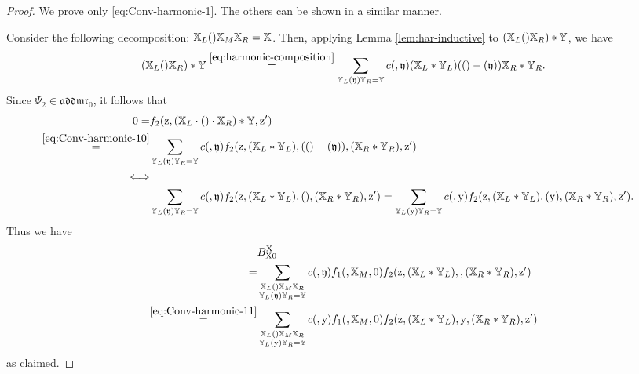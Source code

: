 \documentclass[15pt,oneside,reqno]{amsart}
\theoremstyle{remark}{
\newtheorem{lem}[df]{Lemma}
\newtheorem{prop}[df]{Proposition}
\newtheorem{ex}[df]{Example}
\newtheorem{rmk}[df]{Remark}
}
\newcommand{\ide}[1]{\mathfrak{#1}}
\newcommand{\addmr}{\mathfrak{addmr}}
\let\x\relax
\newcommand{\x}{\mathrm{x}}
\newcommand{\y}{\mathrm{y}}
\newcommand{\z}{\mathrm{z}}
\newcommand{\X}{\mathrm{X}}
\begin{document}
\begin{proof}

We prove only \eqref{eq:Conv-harmonic-1}. The others can be shown in a similar manner.

Consider the following decomposition: $\mathbb{X}_L (\x)\mathbb{X}_M\mathbb{X}_R = \mathbb{X}$.
Then, applying Lemma \ref{lem:har-inductive} to $(\mathbb{X}_L(\x)\mathbb{X}_R) * \mathbb{Y}$, we have
\begin{align}
(\mathbb{X}_L(\x)\mathbb{X}_R) * \mathbb{Y}
\stackrel{\eqref{eq:harmonic-composition}}{=}\sum_{\mathbb{Y}_L(\ide{y})\mathbb{Y}_R = \mathbb{Y}} c (\x,\ide{y})(\mathbb{X}_L * \mathbb{Y}_L)((\x) - (\ide{y}))\mathbb{X}_R * \mathbb{Y}_R. \label{eq:Conv-harmonic-10}
\end{align}
Since $\Psi_2 \in \addmr_0$, it follows that
\begin{align}
0=& f_2(\z , (\mathbb{X}_L\cdot (\x)\cdot \mathbb{X}_R) * \mathbb{Y},\z') \notag \\
\stackrel{\eqref{eq:Conv-harmonic-10}}{=}&\sum_{\mathbb{Y}_L(\ide{y})\mathbb{Y}_R = \mathbb{Y}} c(\x,\ide{y}) f_2(\z,( \mathbb{X}_L * \mathbb{Y}_L), ((\x) - (\ide{y})), (\mathbb{X}_R * \mathbb{Y}_R),\z') \notag \\
\Longleftrightarrow& \notag \\
&
\begin{aligned}
&\sum_{\mathbb{Y}_L(\ide{y})\mathbb{Y}_R = \mathbb{Y}} c(\x,\ide{y}) f_2(\z,( \mathbb{X}_L * \mathbb{Y}_L), (\x), (\mathbb{X}_R * \mathbb{Y}_R),\z')= \sum_{\mathbb{Y}_L(\y)\mathbb{Y}_R = \mathbb{Y}} c(\x,\y) f_2(\z,( \mathbb{X}_L * \mathbb{Y}_L), (\y), (\mathbb{X}_R * \mathbb{Y}_R),\z').
\end{aligned}
 \label{eq:Conv-harmonic-11}
\end{align}
Thus we have
\begin{align*}
&B_{\X0}^{\X}\\
=&\sum_{\substack{\mathbb{X}_L(\x)\mathbb{X}_M \mathbb{X}_R \\ \mathbb{Y}_L(\ide{y})\mathbb{Y}_R = \mathbb{Y}}} c(\x,\ide{y}) f_1(\x,\mathbb{X}_M,0)f_2(\z,(\mathbb{X}_L * \mathbb{Y}_L),\x,(\mathbb{X}_R * \mathbb{Y}_R),\z')\\
\stackrel{\eqref{eq:Conv-harmonic-11}}{=}&
\sum_{\substack{\mathbb{X}_L(\x)\mathbb{X}_M \mathbb{X}_R \\ \mathbb{Y}_L(\y)\mathbb{Y}_R = \mathbb{Y}}} c(\x,\y) f_1(\x,\mathbb{X}_M,0)f_2(\z,(\mathbb{X}_L * \mathbb{Y}_L),\y,(\mathbb{X}_R * \mathbb{Y}_R),\z')
\end{align*}
as claimed.
\end{proof}
\end{document}
